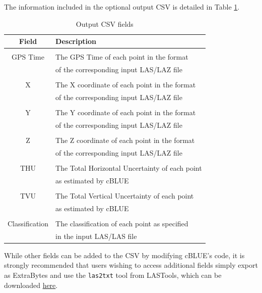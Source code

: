 \documentclass[11pt, a4paper]{article}
\begin{document}
The information included in the optional output CSV is detailed in Table \ref{tab:csv}. 
\begin{table}[H]
    \centering
    \begin{tabular}{c|l}
        \textbf{Field} & \textbf{Description} \\
        \hline \\
        GPS Time & The GPS Time of each point in the format \\
        \ & of the corresponding input LAS/LAZ file \\
        \hline \\
        X &  The X coordinate of each point in the format \\
        \ & of the corresponding input LAS/LAZ file\\
        \hline \\
        Y & The Y coordinate of each point in the format \\
        \ & of the corresponding input LAS/LAZ file \\
        \hline \\
        Z & The Z coordinate of each point in the format \\
        \ & of the corresponding input LAS/LAZ file \\
        \hline \\
        THU & The Total Horizontal Uncertainty of each point \\
        \ & as estimated by cBLUE \\
        \hline \\
        TVU & The Total Vertical Uncertainty of each point \\
        \ & as estimated by cBLUE \\
        \hline \\
        Classification & The classification of each point as specified \\
        \ & in the input LAS/LAS file \\
        \hline
    \end{tabular}
    \caption{Output CSV fields}
    \label{tab:csv}
\end{table}

While other fields can be added to the CSV by modifying cBLUE's code, it is strongly recommended that users wishing to access additional fields simply export as ExtraBytes and use the \texttt{las2txt} tool from LASTools, which can be downloaded \href{https://rapidlasso.com/las2txt/}{here}.
\end{document}

